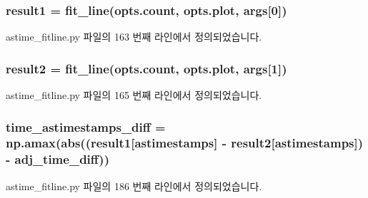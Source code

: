 \subsubsection[{\texorpdfstring{result1}{result1}}]{\setlength{\rightskip}{0pt plus 5cm}result1 = {\bf fit\+\_\+line}(opts.\+count, opts.\+plot, {\bf args}\mbox{[}0\mbox{]})}\hypertarget{namespaceastime__fitline_abdd1d9839bb21323e0874f563b0966b7}{}\label{namespaceastime__fitline_abdd1d9839bb21323e0874f563b0966b7}


astime\+\_\+fitline.\+py 파일의 163 번째 라인에서 정의되었습니다.

\subsubsection[{\texorpdfstring{result2}{result2}}]{\setlength{\rightskip}{0pt plus 5cm}result2 = {\bf fit\+\_\+line}(opts.\+count, opts.\+plot, {\bf args}\mbox{[}1\mbox{]})}\hypertarget{namespaceastime__fitline_a4d090241b41b5d54f7f0a525d6d171f6}{}\label{namespaceastime__fitline_a4d090241b41b5d54f7f0a525d6d171f6}


astime\+\_\+fitline.\+py 파일의 165 번째 라인에서 정의되었습니다.

\subsubsection[{\texorpdfstring{time\+\_\+astimestamps\+\_\+diff}{time_astimestamps_diff}}]{\setlength{\rightskip}{0pt plus 5cm}time\+\_\+astimestamps\+\_\+diff = np.\+amax(abs(({\bf result1}\mbox{[}\textquotesingle{}astimestamps\textquotesingle{}\mbox{]} -\/ {\bf result2}\mbox{[}\textquotesingle{}astimestamps\textquotesingle{}\mbox{]}) -\/ {\bf adj\+\_\+time\+\_\+diff}))}\hypertarget{namespaceastime__fitline_ac6293bb95c6f5d4d85bb106d8fb1676d}{}\label{namespaceastime__fitline_ac6293bb95c6f5d4d85bb106d8fb1676d}


astime\+\_\+fitline.\+py 파일의 186 번째 라인에서 정의되었습니다.

